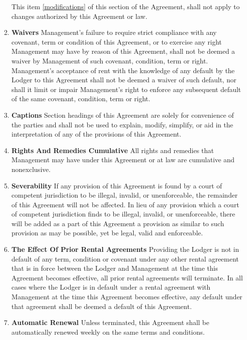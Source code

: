 \documentclass[12pt,letterpaper]{article}
\newcommand{\management}{Management}
\newcommand{\lodger}{Lodger}
\begin{document}
\begin{enumerate}
		This item \ref{modifications} of this section of the Agreement, shall not apply to changes authorized by this Agreement or law.
	\item \textbf{Waivers} \quad 
		\management{}'s failure to require strict compliance with any covenant, term or condition of this Agreement, or to exercise any right \management{} may have by reason of this Agreement, shall not be deemed a waiver by \management{} of such covenant, condition, term or right. \management{}'s acceptance of rent with the knowledge of any default by the \lodger{} to this Agreement shall not be deemed a waiver of such default, nor shall it limit or impair \management{}'s right to enforce any subsequent default of the same covenant, condition, term or right. 
	\item \textbf{Captions} \quad 
		Section headings of this Agreement are solely for convenience of the parties and shall not be used to explain, modify, simplify, or aid in the interpretation of any of the provisions of this Agreement. 
	\item \textbf{Rights And Remedies Cumulative} \quad 
		All rights and remedies that \management{} may have under this Agreement or at law are cumulative and nonexclusive. 
	\item \textbf{Severability} \quad 
		If any provision of this Agreement is found by a court of competent jurisdiction to be illegal, invalid, or unenforceable, the remainder of this Agreement will not be affected. In lieu of any provision which a court of competent jurisdiction finds to be illegal, invalid, or unenforceable, there will be added as a part of this Agreement a provision as similar to such provision as may be possible, yet be legal, valid and enforceable. 
	\item \textbf{The Effect Of Prior Rental Agreements} \quad 
		Providing the \lodger{} is not in default of any term, condition or covenant under any other rental agreement that is in force between the \lodger{} and \management{} at the time this Agreement becomes effective, all prior rental agreements will terminate. In all cases where the \lodger{} is in default under a rental agreement with \management{} at the time this Agreement becomes effective, any default under that agreement shall be deemed a default of this Agreement. 
	\item \textbf{Automatic Renewal} \quad 
		Unless terminated, this Agreement shall be automatically renewed weekly on the same terms and conditions. 
\end{enumerate}
\end{document}
